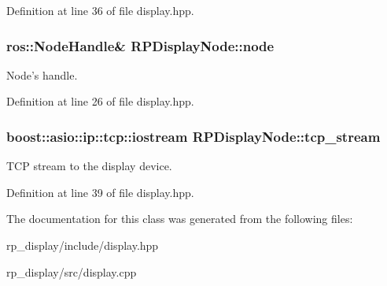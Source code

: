 \-Definition at line 36 of file display.\-hpp.

\hypertarget{class_r_p_display_node_ad6d8ebb35b06877b8fffe1a99f556c13}{
\subsubsection[{node}]{\setlength{\rightskip}{0pt plus 5cm}ros\-::\-Node\-Handle\& {\bf \-R\-P\-Display\-Node\-::node}}}\label{class_r_p_display_node_ad6d8ebb35b06877b8fffe1a99f556c13}
\-Node's handle. 

\-Definition at line 26 of file display.\-hpp.

\hypertarget{class_r_p_display_node_ab6617bd56195bb1408852121de2cb838}{
\subsubsection[{tcp\-\_\-stream}]{\setlength{\rightskip}{0pt plus 5cm}boost\-::asio\-::ip\-::tcp\-::iostream {\bf \-R\-P\-Display\-Node\-::tcp\-\_\-stream}}}\label{class_r_p_display_node_ab6617bd56195bb1408852121de2cb838}
\-T\-C\-P stream to the display device. 

\-Definition at line 39 of file display.\-hpp.



\-The documentation for this class was generated from the following files\-:\begin{DoxyCompactItemize}
\item 
rp\-\_\-display/include/display.\-hpp\item 
rp\-\_\-display/src/display.\-cpp\end{DoxyCompactItemize}
